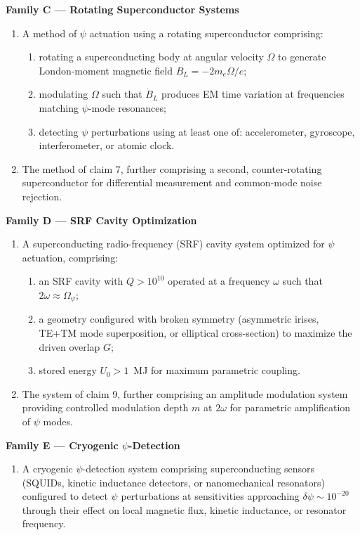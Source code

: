 \documentclass[12pt,letterpaper]{article}
\begin{document}
\begin{tcolorbox}[colback=blue!5!white, colframe=blue!50!black,
title=Patent \#17 -- Proposed Claims]
\textbf{Family C --- Rotating Superconductor Systems}
\begin{enumerate}[resume]
\item A method of $\psi$ actuation using a rotating superconductor
comprising:
\begin{enumerate}[label=(\alph*)]
\item rotating a superconducting body at angular velocity $\Omega$
to generate London-moment magnetic field $B_L = -2m_e\Omega/e$;
\item modulating $\Omega$ such that $\dot{B}_L$ produces EM time
variation at frequencies matching $\psi$-mode resonances;
\item detecting $\psi$ perturbations using at least one of:
accelerometer, gyroscope, interferometer, or atomic clock.
\end{enumerate}

\item The method of claim 7, further comprising a second,
counter-rotating superconductor for differential measurement and
common-mode noise rejection.
\end{enumerate}

\textbf{Family D --- SRF Cavity Optimization}
\begin{enumerate}[resume]
\item A superconducting radio-frequency (SRF) cavity system optimized
for $\psi$ actuation, comprising:
\begin{enumerate}[label=(\alph*)]
\item an SRF cavity with $Q > 10^{10}$ operated at a frequency $\omega$
such that $2\omega \approx \Omega_\psi$;
\item a geometry configured with broken symmetry (asymmetric irises,
TE+TM mode superposition, or elliptical cross-section) to maximize
the driven overlap $G$;
\item stored energy $U_0 > 1$~MJ for maximum parametric coupling.
\end{enumerate}

\item The system of claim 9, further comprising an amplitude modulation
system providing controlled modulation depth $m$ at $2\omega$ for
parametric amplification of $\psi$ modes.
\end{enumerate}

\textbf{Family E --- Cryogenic $\psi$-Detection}
\begin{enumerate}[resume]
\item A cryogenic $\psi$-detection system comprising superconducting
sensors (SQUIDs, kinetic inductance detectors, or nanomechanical
resonators) configured to detect $\psi$ perturbations at sensitivities
approaching $\delta\psi \sim 10^{-20}$ through their effect on
local magnetic flux, kinetic inductance, or resonator frequency.
\end{enumerate}
\end{tcolorbox}
\end{document}
